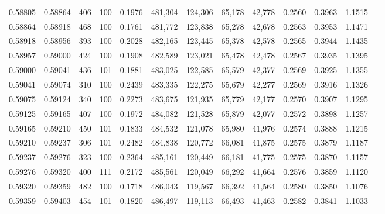 \begin{tabular}{rrrrrrrrrrrrr}
0.58805 & 0.58864 &   406 & 100 &                                     0.1976 & 481,304 & 124,306 &  65,178 &  42,778 & 0.2560 & 0.3963 & 1.1515 \\
0.58864 & 0.58918 &   468 & 100 &                                     0.1761 & 481,772 & 123,838 &  65,278 &  42,678 & 0.2563 & 0.3953 & 1.1471 \\
0.58918 & 0.58956 &   393 & 100 &                                     0.2028 & 482,165 & 123,445 &  65,378 &  42,578 & 0.2565 & 0.3944 & 1.1435 \\
0.58957 & 0.59000 &   424 & 100 &                                     0.1908 & 482,589 & 123,021 &  65,478 &  42,478 & 0.2567 & 0.3935 & 1.1395 \\
0.59000 & 0.59041 &   436 & 101 &                                     0.1881 & 483,025 & 122,585 &  65,579 &  42,377 & 0.2569 & 0.3925 & 1.1355 \\
0.59041 & 0.59074 &   310 & 100 &                                     0.2439 & 483,335 & 122,275 &  65,679 &  42,277 & 0.2569 & 0.3916 & 1.1326 \\
0.59075 & 0.59124 &   340 & 100 &                                     0.2273 & 483,675 & 121,935 &  65,779 &  42,177 & 0.2570 & 0.3907 & 1.1295 \\
0.59125 & 0.59165 &   407 & 100 &                                     0.1972 & 484,082 & 121,528 &  65,879 &  42,077 & 0.2572 & 0.3898 & 1.1257 \\
0.59165 & 0.59210 &   450 & 101 &                                     0.1833 & 484,532 & 121,078 &  65,980 &  41,976 & 0.2574 & 0.3888 & 1.1215 \\
0.59210 & 0.59237 &   306 & 101 &                                     0.2482 & 484,838 & 120,772 &  66,081 &  41,875 & 0.2575 & 0.3879 & 1.1187 \\
0.59237 & 0.59276 &   323 & 100 &                                     0.2364 & 485,161 & 120,449 &  66,181 &  41,775 & 0.2575 & 0.3870 & 1.1157 \\
0.59276 & 0.59320 &   400 & 111 &                                     0.2172 & 485,561 & 120,049 &  66,292 &  41,664 & 0.2576 & 0.3859 & 1.1120 \\
0.59320 & 0.59359 &   482 & 100 &                                     0.1718 & 486,043 & 119,567 &  66,392 &  41,564 & 0.2580 & 0.3850 & 1.1076 \\
0.59359 & 0.59403 &   454 & 101 &                                     0.1820 & 486,497 & 119,113 &  66,493 &  41,463 & 0.2582 & 0.3841 & 1.1033 \\

\end{tabular}
